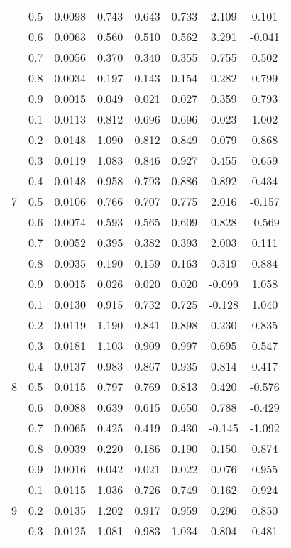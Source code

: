 \documentclass[11pt,a4paper]{report}
\begin{document}
\begin{longtable}{ | c | c || c | c | c | c | c | c | }
 & 0.5 & 0.0098 & 0.743 & 0.643 & 0.733 & 2.109 & 0.101 \\
 & 0.6 & 0.0063 & 0.560 & 0.510 & 0.562 & 3.291 & -0.041 \\
 & 0.7 & 0.0056 & 0.370 & 0.340 & 0.355 & 0.755 & 0.502 \\
 & 0.8 & 0.0034 & 0.197 & 0.143 & 0.154 & 0.282 & 0.799 \\
 & 0.9 & 0.0015 & 0.049 & 0.021 & 0.027 & 0.359 & 0.793 \\
 \hline
\multirow{9}{*}{7} & 0.1 & 0.0113 & 0.812 & 0.696 & 0.696 & 0.023 & 1.002 \\
 & 0.2 & 0.0148 & 1.090 & 0.812 & 0.849 & 0.079 & 0.868 \\
 & 0.3 & 0.0119 & 1.083 & 0.846 & 0.927 & 0.455 & 0.659 \\
 & 0.4 & 0.0148 & 0.958 & 0.793 & 0.886 & 0.892 & 0.434 \\
 & 0.5 & 0.0106 & 0.766 & 0.707 & 0.775 & 2.016 & -0.157 \\
 & 0.6 & 0.0074 & 0.593 & 0.565 & 0.609 & 0.828 & -0.569 \\
 & 0.7 & 0.0052 & 0.395 & 0.382 & 0.393 & 2.003 & 0.111 \\
 & 0.8 & 0.0035 & 0.190 & 0.159 & 0.163 & 0.319 & 0.884 \\
 & 0.9 & 0.0015 & 0.026 & 0.020 & 0.020 & -0.099 & 1.058 \\
 \hline
\multirow{9}{*}{8} & 0.1 & 0.0130 & 0.915 & 0.732 & 0.725 & -0.128 & 1.040 \\
 & 0.2 & 0.0119 & 1.190 & 0.841 & 0.898 & 0.230 & 0.835 \\
 & 0.3 & 0.0181 & 1.103 & 0.909 & 0.997 & 0.695 & 0.547 \\
 & 0.4 & 0.0137 & 0.983 & 0.867 & 0.935 & 0.814 & 0.417 \\
 & 0.5 & 0.0115 & 0.797 & 0.769 & 0.813 & 0.420 & -0.576 \\
 & 0.6 & 0.0088 & 0.639 & 0.615 & 0.650 & 0.788 & -0.429 \\
 & 0.7 & 0.0065 & 0.425 & 0.419 & 0.430 & -0.145 & -1.092 \\
 & 0.8 & 0.0039 & 0.220 & 0.186 & 0.190 & 0.150 & 0.874 \\
 & 0.9 & 0.0016 & 0.042 & 0.021 & 0.022 & 0.076 & 0.955 \\
 \hline
\multirow{9}{*}{9} & 0.1 & 0.0115 & 1.036 & 0.726 & 0.749 & 0.162 & 0.924 \\
 & 0.2 & 0.0135 & 1.202 & 0.917 & 0.959 & 0.296 & 0.850 \\
 & 0.3 & 0.0125 & 1.081 & 0.983 & 1.034 & 0.804 & 0.481 \\

\end{longtable}
\end{document}
